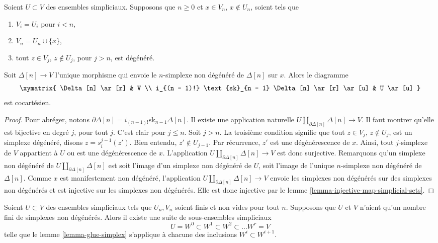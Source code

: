 \begin{lemma}
\label{lemma-glue-simplex}
Soient $U \subset V$ des ensembles simpliciaux. Supposons que
$n \geq 0$ et $x \in V_n$, $x \not \in U_n$, soient tels que
\begin{enumerate}
\item $V_i = U_i$ pour $i < n$,
\item $V_n = U_n \cup \{x\}$,
\item tout $z \in V_j$, $z \not \in U_j$, pour $j > n$, est dégénéré.
\end{enumerate}
Soit $\Delta[n] \to V$ l'unique morphisme qui envoie le $n$-simplexe non
dégénéré de $\Delta[n]$ sur $x$. Alors le diagramme
$$
\xymatrix{
\Delta[n] \ar[r] & V \\
i_{(n - 1)!} \text{sk}_{n - 1} \Delta[n] \ar[r] \ar[u] & U \ar[u]
}
$$
est cocartésien.
\end{lemma}

\begin{proof}
Pour abréger, notons
$\partial \Delta[n] = i_{(n - 1)!} \text{sk}_{n - 1} \Delta[n]$.
Il existe une application naturelle
$U \amalg_{\partial \Delta[n]} \Delta[n] \to V$. Il faut montrer qu'elle
est bijective en degré $j$, pour tout $j$. C'est clair pour $j \leq n$.
Soit $j > n$. La troisième condition signifie que tout $z \in V_j$,
$z \not \in U_j$, est un simplexe dégénéré, disons
$z = s^{j - 1}_i(z')$. Bien entendu, $z' \not \in U_{j - 1}$.
Par récurrence, $z'$ est une dégénérescence de $x$. Ainsi, tout
$j$-simplexe de $V$ appartient à $U$ ou est une dégénérescence de $x$.
L'application $U \amalg_{\partial \Delta[n]} \Delta[n] \to V$ est donc
surjective. Remarquons qu'un simplexe non dégénéré de
$U \amalg_{\partial \Delta[n]} \Delta[n]$ est soit l'image d'un simplexe
non dégénéré de $U$, soit l'image de l'unique $n$-simplexe non dégénéré
de $\Delta[n]$. Comme $x$ est manifestement non dégénéré, l'application
$U \amalg_{\partial \Delta[n]} \Delta[n] \to V$ envoie les simplexes non
dégénérés sur des simplexes non dégénérés et est injective sur les
simplexes non dégénérés. Elle est donc injective par le lemme
\ref{lemma-injective-map-simplicial-sets}.
\end{proof}

\begin{lemma}
\label{lemma-add-simplices}
Soient $U \subset V$ des ensembles simpliciaux tels que $U_n, V_n$
soient finis et non vides pour tout $n$. Supposons que $U$ et $V$
n'aient qu'un nombre fini de simplexes non dégénérés. Alors il existe une
suite de sous-ensembles simpliciaux
$$
U = W^0 \subset W^1 \subset W^2 \subset \ldots W^r = V
$$
telle que le lemme \ref{lemma-glue-simplex} s'applique à chacune des
inclusions $W^i \subset W^{i + 1}$.
\end{lemma}

